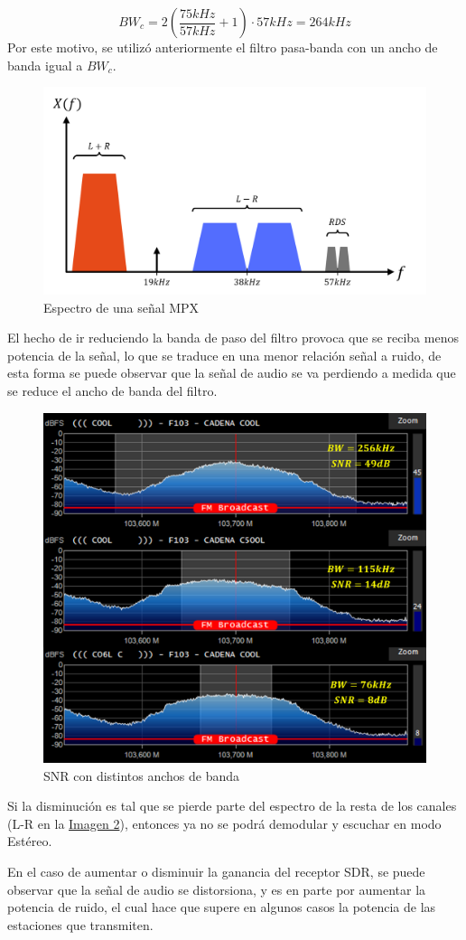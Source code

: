$$
BW_{c} = 2\left( \dfrac{75kHz}{57kHz}+ 1 \right) \cdot 57kHz = 264kHz
$$
Por este motivo, se utilizó anteriormente el filtro pasa-banda con un ancho de banda igual a $BW_{c}$.
\begin{figure}[H]
    \centering
    \includegraphics[width=0.8\columnwidth]{images/1.2-espectro-mpx.png}
    \caption{Espectro de una señal MPX}
    \label{fig:imagen2}
\end{figure}

El hecho de ir reduciendo la banda de paso del filtro provoca que se reciba menos potencia de la señal, lo que se traduce en una menor relación señal a ruido, de esta forma se puede observar que la señal de audio se va perdiendo a medida que se reduce el ancho de banda del filtro.

\begin{figure}[H]
    \centering
    \includegraphics[width=0.9\columnwidth]{images/1.3-mod-bw.png}
    \caption{SNR con distintos anchos de banda}
    \label{fig:imagen3}
\end{figure}

Si la disminución es tal que se pierde parte del espectro de la resta de los canales (L-R en la \hyperref[fig:imagen2]{Imagen 2}), entonces ya no se podrá demodular y escuchar en modo Estéreo.

En el caso de aumentar o disminuir la ganancia del receptor SDR, se puede observar que la señal de audio se distorsiona, y es en parte por aumentar la potencia de ruido, el cual hace que supere en algunos casos la potencia de las estaciones que transmiten.


\hspace{1cm}
